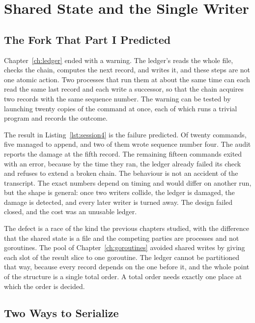\chapter{Shared State and the Single Writer}
\label{ch:writer}

\section{The Fork That Part I Predicted}

Chapter~\ref{ch:ledger} ended with a warning. The ledger's  reads the whole file, checks the chain, computes the next record, and writes it, and these steps are not one atomic action. Two processes that run them at about the same time can each read the same last record and each write a successor, so that the chain acquires two records with the same sequence number. The warning can be tested by launching twenty copies of the command at once, each of which runs a trivial program and records the outcome.



The result in Listing~\ref{lst:session4} is the failure predicted. Of twenty commands, five managed to append, and two of them wrote sequence number four. The audit reports the damage at the fifth record. The remaining fifteen commands exited with an error, because by the time they ran, the ledger already failed its check and  refuses to extend a broken chain. The behaviour is not an accident of the transcript. The exact numbers depend on timing and would differ on another run, but the shape is general: once two writers collide, the ledger is damaged, the damage is detected, and every later writer is turned away. The design failed closed, and the cost was an unusable ledger.

The defect is a race of the kind the previous chapters studied, with the difference that the shared state is a file and the competing parties are processes and not goroutines. The pool of Chapter~\ref{ch:goroutines} avoided shared writes by giving each slot of the result slice to one goroutine. The ledger cannot be partitioned that way, because every record depends on the one before it, and the whole point of the structure is a single total order. A total order needs exactly one place at which the order is decided.

\section{Two Ways to Serialize}

